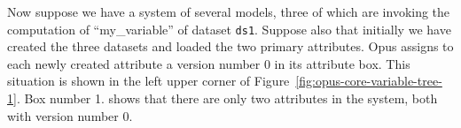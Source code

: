 {\begin{figure}
\begin{center}
\end{center}
\end{figure}

Now suppose we have a system of several models, three of which are invoking
the computation of ``my_variable'' \variablesindex of dataset \datasetindex \verb|ds1|. Suppose also that
initially we have created the three datasets \datasetindex and loaded the two primary
attributes. \primaryattributesindex Opus assigns to each newly created attribute \attributesindex a version number 0 in
its attribute \attributesindex box.  This situation is shown in the left upper corner of
Figure~\ref{fig:opus-core-variable-tree-1}. Box number 1. shows that there are only
two attributes \attributesindex in the system, both with version number 0.

}
